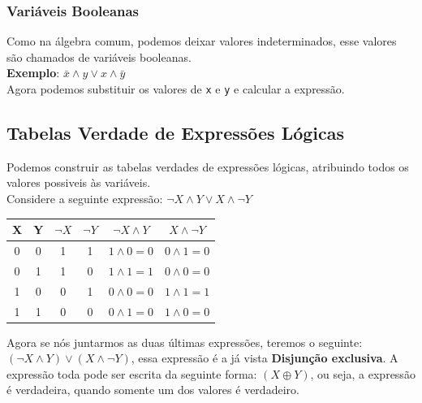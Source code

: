 \documentclass[12pt, onecolumn]{article}
\begin{document}
	\subsubsection{\centering Variáveis Booleanas}
	
	Como na álgebra comum, podemos deixar valores indeterminados, esse valores
	são chamados de variáveis booleanas.\\
	\newline
	\textbf{Exemplo}: $\bar{x} \land y \lor x \land \bar{y}$ \\
	Agora podemos substituir os valores de \texttt{x} e \texttt{y} e calcular
	a expressão. \\
		
	\subsection{\centering Tabelas Verdade de Expressões Lógicas}

	Podemos construir as tabelas verdades de expressões lógicas, atribuindo
	todos os valores possiveis às variáveis.\\
	\newline
	Considere a seguinte expressão: $\lnot{X} \land Y \lor X \land \lnot{Y}$ \\
	\begin{table}[ht]
		\centering
		\begin{tabular}{|c|c|c|c|c|c|}
			\hline
			X & Y & $\lnot{X}$ & $\lnot{Y}$ & $\lnot X \land Y$
			& $X\land \lnot Y$ \\ \hline

			0 & 0 & 1 & 1 & $1 \land 0 = 0$ & $0 \land 1 = 0$ \\
			0 & 1 & 1 & 0 & $1 \land 1 = 1$ & $0 \land 0 = 0$ \\
			1 & 0 & 0 & 1 & $0 \land 0 = 0$ & $1 \land 1 = 1$ \\
			1 & 1 & 0 & 0 & $0 \land 1 = 0$ & $1 \land 0 = 0$ \\
			\hline
		\end{tabular}
	\end{table}

	Agora se nós juntarmos as duas últimas expressões, teremos o seguinte:\\
	\newline
	$(\lnot X \land Y) \lor (X \land \lnot Y)$, essa expressão é a já vista
	\textbf{Disjunção exclusiva}. A expressão toda pode ser escrita da seguinte 
	forma: $(X \oplus Y)$, ou seja, a expressão é verdadeira, quando somente um 
	dos valores é verdadeiro.
\end{document}
